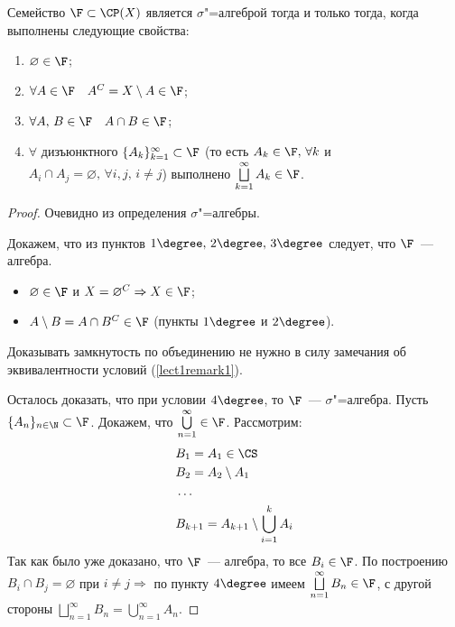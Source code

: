 \begin{claim}[Критерий $\sigma$"=алгебры]
    Семейство $\F\subset \CP(X)$ является $\sigma$"=алгеброй тогда и только тогда, когда выполнены следующие свойства: 
    \begin{enumerate}[label=\arabic*\degree.]
        \item $\varnothing\in\F$;
        \item $\forall A\in\F \quad A^C=X\setminus A\in\F$;
        \item $\forall A,\, B\in\F\quad A\cap B\in\F$;
        \item $\forall$ дизъюнктного $\{A_k\}_{k=1}^{\infty}\subset \F$ (то есть $A_k\in\F, \, \forall k$ и
        $A_i\cap A_j=\varnothing,\, \forall i,j,\, i\neq j$) выполнено $\bigsqcup\limits_{k=1}^{\infty}A_k\in\F$.
    \end{enumerate}

    \begin{proof}
        \circled{$\Rightarrow$} Очевидно из определения $\sigma$"=алгебры.

        \circled{$\Leftarrow$} Докажем, что из пунктов $1\degree, \, 2\degree,\, 3\degree$ следует, что $\F$~--- алгебра.
        \begin{itemize}
            \item $\varnothing\in\F$ и $X = \varnothing^C\Rightarrow X\in\F$;
            \item $A\setminus B = A\cap B^C\in\F$ (пункты $1\degree$ и $2\degree$).
        \end{itemize}
        \begin{remark}
            Доказывать замкнутость по объединению не нужно в силу замечания об эквивалентности условий (\ref{lect1remark1}).
        \end{remark}

        Осталось доказать, что при условии $4\degree$, то $\F$~--- $\sigma$"=алгебра. Пусть 
        $\{A_n\}_{n\in\N}\subset \F$. Докажем, что $\bigcup\limits_{n=1}^{\infty}\in\F$.
        Рассмотрим:
        \begin{align*}
            &B_1 = A_1\in\CS\\
            &B_2 = A_2\setminus A_1\\
            &\ldots\\
            &B_{k+1}=A_{k+1}\setminus\bigcup_{i=1}^k A_i
        \end{align*}
        Так как было уже доказано, что $\F$~--- алгебра, то все $B_i\in\F$. По построению $B_i\cap B_j=\varnothing$ при
        $i\neq j\Rightarrow$ по пункту $4\degree$ имеем $\bigsqcup\limits_{n=1}^{\infty}B_n\in\F$, с другой стороны 
        $\bigsqcup\limits_{n=1}^{\infty}B_n = \bigcup\limits_{n=1}^{\infty}A_n$.

    \end{proof}
\end{claim}

